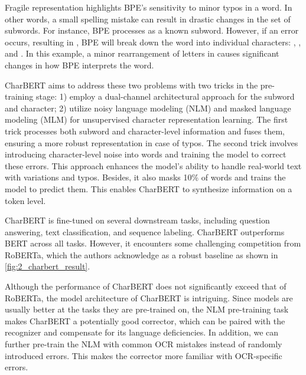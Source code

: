 Fragile representation highlights BPE's sensitivity to minor typos in a word. In other words, a small spelling mistake can result in drastic changes in the set of subwords. For instance, BPE processes  as a known subword. However, if an error occurs, resulting in , BPE will break down the word into individual characters: , , and . In this example, a minor rearrangement of letters in  causes significant changes in how BPE interprets the word.

CharBERT aims to address these two problems with two tricks in the pre-training stage: 1) employ a dual-channel architectural approach for the subword and character; 2) utilize noisy language modeling (NLM) and masked language modeling (MLM) for unsupervised character representation learning. The first trick processes both subword and character-level information and fuses them, ensuring a more robust representation in case of typos. The second trick involves introducing character-level noise into words and training the model to correct these errors. This approach enhances the model's ability to handle real-world text with variations and typos. Besides, it also masks 10\% of words and trains the model to predict them. This enables CharBERT to synthesize information on a token level.

CharBERT is fine-tuned on several downstream tasks, including question answering, text classification, and sequence labeling. CharBERT outperforms BERT across all tasks. However, it encounters some challenging competition from RoBERTa, which the authors acknowledge as a robust baseline as shown in \autoref{fig:2_charbert_result}.


Although the performance of CharBERT does not significantly exceed that of RoBERTa, the model architecture of CharBERT is intriguing. Since models are usually better at the tasks they are pre-trained on, the NLM pre-training task makes CharBERT a potentially good corrector, which can be paired with the recognizer and compensate for its language deficiencies. In addition, we can further pre-train the NLM with common OCR mistakes instead of randomly introduced errors. This makes the corrector more familiar with OCR-specific errors.

